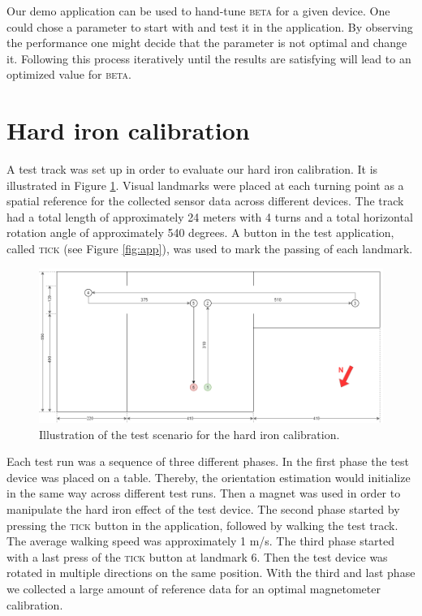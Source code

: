Our demo application can be used to hand-tune \textsc{beta} for a given device. One could chose a parameter to start with and test it in the application. By observing the performance one might decide that the parameter is not optimal and change it. Following this process iteratively until the results are satisfying will lead to an optimized value for \textsc{beta}.

\section{Hard iron calibration}


A test track was set up in order to evaluate our hard iron calibration. It is illustrated in Figure \ref{fig:eval_scenario}. Visual landmarks were placed at each turning point as a spatial reference for the collected sensor data across different devices. The track had a total length of approximately 24 meters with 4 turns and a total horizontal rotation angle of approximately 540 degrees. A button in the test application, called \textsc{tick} (see Figure \ref{fig:app}), was used to mark the passing of each landmark.

\begin{figure}[H]
    \centering
    \includegraphics[width=1.0\textwidth]{figures/scenario.png}
    \caption{Illustration of the test scenario for the hard iron calibration.}
    \label{fig:eval_scenario}
\end{figure}

Each test run was a sequence of three different phases. In the first phase the test device was placed on a table. Thereby, the orientation estimation would initialize in the same way across different test runs. Then a magnet was used in order to manipulate the hard iron effect of the test device. The second phase started by pressing the \textsc{tick} button in the application, followed by walking the test track. The average walking speed was approximately 1 m/s. The third phase started with a last press of the \textsc{tick} button at landmark 6. Then the test device was rotated in multiple directions on the same position. With the third and last phase we collected a large amount of reference data for an optimal magnetometer calibration.

